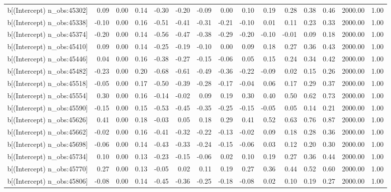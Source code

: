 \begin{table}[ht]
\begin{tabular}{rrrrrrrrrrrrrrr}
  b[(Intercept) n\_obs:45302] & 0.09 & 0.00 & 0.14 & -0.30 & -0.20 & -0.09 & 0.00 & 0.10 & 0.19 & 0.28 & 0.38 & 0.46 & 2000.00 & 1.00 \\ 
  b[(Intercept) n\_obs:45338] & -0.10 & 0.00 & 0.16 & -0.51 & -0.41 & -0.31 & -0.21 & -0.10 & 0.01 & 0.11 & 0.23 & 0.33 & 2000.00 & 1.00 \\ 
  b[(Intercept) n\_obs:45374] & -0.20 & 0.00 & 0.14 & -0.56 & -0.47 & -0.38 & -0.29 & -0.20 & -0.10 & -0.01 & 0.09 & 0.18 & 2000.00 & 1.00 \\ 
  b[(Intercept) n\_obs:45410] & 0.09 & 0.00 & 0.14 & -0.25 & -0.19 & -0.10 & 0.00 & 0.09 & 0.18 & 0.27 & 0.36 & 0.43 & 2000.00 & 1.00 \\ 
  b[(Intercept) n\_obs:45446] & 0.04 & 0.00 & 0.16 & -0.38 & -0.27 & -0.15 & -0.06 & 0.05 & 0.15 & 0.24 & 0.34 & 0.42 & 2000.00 & 1.00 \\ 
  b[(Intercept) n\_obs:45482] & -0.23 & 0.00 & 0.20 & -0.68 & -0.61 & -0.49 & -0.36 & -0.22 & -0.09 & 0.02 & 0.15 & 0.26 & 2000.00 & 1.00 \\ 
  b[(Intercept) n\_obs:45518] & -0.05 & 0.00 & 0.17 & -0.50 & -0.39 & -0.28 & -0.17 & -0.04 & 0.06 & 0.17 & 0.29 & 0.37 & 2000.00 & 1.00 \\ 
  b[(Intercept) n\_obs:45554] & 0.30 & 0.00 & 0.16 & -0.14 & -0.02 & 0.09 & 0.19 & 0.30 & 0.40 & 0.50 & 0.62 & 0.73 & 2000.00 & 1.00 \\ 
  b[(Intercept) n\_obs:45590] & -0.15 & 0.00 & 0.15 & -0.53 & -0.45 & -0.35 & -0.25 & -0.15 & -0.05 & 0.05 & 0.14 & 0.21 & 2000.00 & 1.00 \\ 
  b[(Intercept) n\_obs:45626] & 0.41 & 0.00 & 0.18 & -0.03 & 0.05 & 0.18 & 0.29 & 0.41 & 0.52 & 0.63 & 0.76 & 0.87 & 2000.00 & 1.00 \\ 
  b[(Intercept) n\_obs:45662] & -0.02 & 0.00 & 0.16 & -0.41 & -0.32 & -0.22 & -0.13 & -0.02 & 0.09 & 0.18 & 0.28 & 0.36 & 2000.00 & 1.00 \\ 
  b[(Intercept) n\_obs:45698] & -0.06 & 0.00 & 0.14 & -0.43 & -0.33 & -0.24 & -0.15 & -0.06 & 0.03 & 0.12 & 0.20 & 0.30 & 2000.00 & 1.00 \\ 
  b[(Intercept) n\_obs:45734] & 0.10 & 0.00 & 0.13 & -0.23 & -0.15 & -0.06 & 0.02 & 0.10 & 0.19 & 0.27 & 0.36 & 0.44 & 2000.00 & 1.00 \\ 
  b[(Intercept) n\_obs:45770] & 0.27 & 0.00 & 0.13 & -0.05 & 0.02 & 0.11 & 0.19 & 0.27 & 0.36 & 0.44 & 0.52 & 0.60 & 2000.00 & 1.00 \\ 
  b[(Intercept) n\_obs:45806] & -0.08 & 0.00 & 0.14 & -0.45 & -0.36 & -0.25 & -0.18 & -0.08 & 0.02 & 0.10 & 0.19 & 0.27 & 2000.00 & 1.00 \\ 

\end{tabular}
\end{table}
